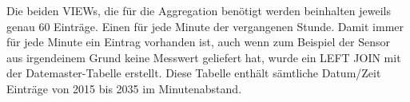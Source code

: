 Die beiden VIEWs, die für die Aggregation benötigt werden beinhalten jeweils genau 60 Einträge. Einen für jede Minute der vergangenen Stunde. Damit immer für jede Minute ein Eintrag vorhanden ist, auch wenn zum Beispiel der Sensor aus irgendeinem Grund keine Messwert geliefert hat, wurde ein LEFT JOIN mit der Datemaster-Tabelle erstellt. Diese Tabelle enthält sämtliche Datum/Zeit Einträge von 2015 bis 2035 im Minutenabstand.









